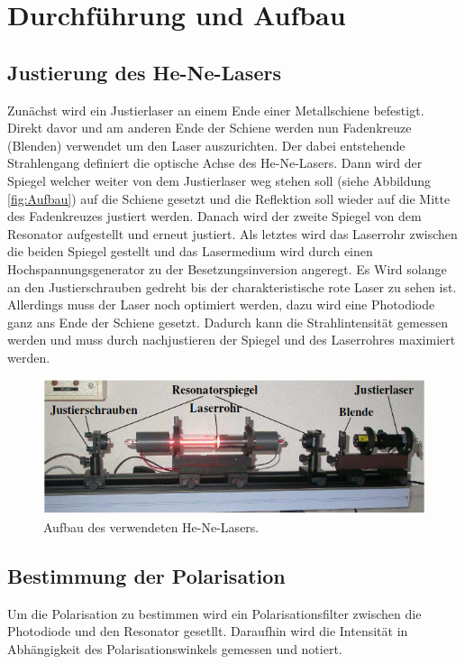 \section{Durchführung und Aufbau}
\label{sec:Durchführung}

\subsection{Justierung des He-Ne-Lasers}
Zunächst wird ein Justierlaser an einem Ende einer Metallschiene befestigt. Direkt davor und am anderen Ende der Schiene werden nun Fadenkreuze (Blenden) verwendet um den Laser auszurichten. Der dabei entstehende Strahlengang definiert die optische Achse des He-Ne-Lasers. Dann wird der Spiegel welcher weiter von dem Justierlaser weg stehen soll (siehe Abbildung \eqref{fig:Aufbau}) auf die Schiene gesetzt und die Reflektion soll wieder auf die Mitte des Fadenkreuzes justiert werden. Danach wird der zweite Spiegel von dem Resonator aufgestellt und erneut justiert. Als letztes wird das Laserrohr zwischen die beiden Spiegel gestellt und das Lasermedium wird durch einen Hochspannungsgenerator zu der Besetzungsinversion angeregt. Es Wird solange an den Justierschrauben gedreht bis der charakteristische rote Laser zu sehen ist. Allerdings muss der Laser noch optimiert werden, dazu wird eine Photodiode ganz ans Ende der Schiene gesetzt. Dadurch kann die Strahlintensität gemessen werden und muss durch nachjustieren der Spiegel und des Laserrohres maximiert werden.

\begin{figure}[H]
  \includegraphics[width=\linewidth]{Bilder/Aufbau.png}
  \caption{Aufbau des verwendeten He-Ne-Lasers. \cite{V61}}
  \label{fig:Aufbau}
\end{figure}

\subsection{Bestimmung der Polarisation}
Um die Polarisation zu bestimmen wird ein Polarisationsfilter zwischen die Photodiode und den Resonator gesetllt. Daraufhin wird die Intensität in Abhängigkeit des Polarisationswinkels gemessen und notiert.

